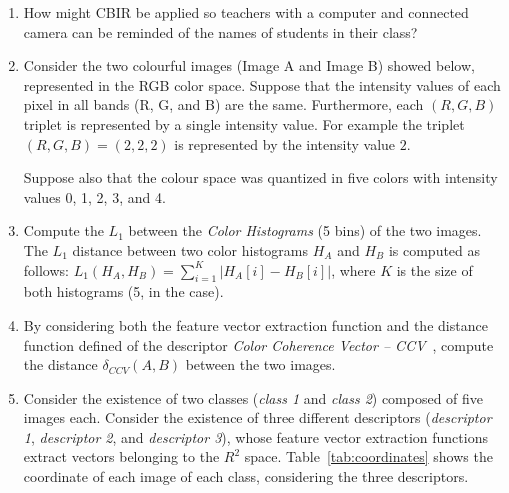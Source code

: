 \begin{enumerate}
\item
How might CBIR be applied so teachers with a computer and connected camera can be reminded of the names of students in their class?

\item Consider the two colourful images (Image A and Image B) showed below, represented in the RGB color space. Suppose that the intensity values of each pixel in all bands (R, G, and B) are the same. Furthermore, each $(R,G,B)$ triplet is represented by a single intensity value. For example the triplet $(R,G,B)= (2,2,2)$ is represented by the intensity value $2$.

Suppose also that the colour space was quantized in five colors with intensity values 0, 1, 2, 3, and 4.

\item Compute the $L_1$ between the {\em Color Histograms} (5
  bins) of the two images. The $L_1$ distance between two color histograms $H_A$ and $H_B$ is computed as follows: $L_1(H_A, H_B) = \sum_{i=1}^{K}|H_A[i]- H_B[i]|$, where $K$ is the size of both histograms (5, in the case).


\item By considering both the feature vector extraction function and the distance function defined of the descriptor {\em Color Coherence Vector -- CCV}~\cite{Burns2006}, compute the distance
  $\delta_{CCV}(A,B)$ between the two images.

\item Consider the existence of two classes ({\em class 1} and {\em
class 2}) composed of five images each. Consider the existence of three different descriptors ({\em descriptor 1}, {\em descriptor 2}, and {\em descriptor 3}), whose feature vector extraction functions extract vectors belonging to the $R^2$ space.
Table~\ref{tab:coordinates} shows the coordinate of each image of each class, considering the three descriptors.
\end{enumerate}
